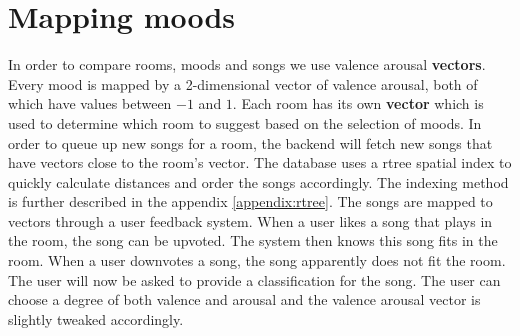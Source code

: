 \pagebreak
\section{Mapping moods}
\label{mapping-moods}
In order to compare rooms, moods and songs we use \gls{valence} \gls{arousal} \textbf{vectors}.
Every mood is mapped by a 2-dimensional vector of \gls{valence} \gls{arousal}, both of which have values between $-1$ and $1$.
Each room has its own \textbf{vector} which is used to determine which room to suggest based on the selection of moods.
In order to queue up new songs for a room, the backend will fetch new songs that have vectors close to the room's vector.
The database uses a \gls{rtree} spatial index to quickly calculate distances and order the songs accordingly.
The indexing method is further described in the appendix \ref{appendix:rtree}.
The songs are mapped to vectors through a user feedback system.
When a user likes a song that plays in the room, the song can be upvoted.
The system then knows this song fits in the room.
When a user downvotes a song, the song apparently does not fit the room.
The user will now be asked to provide a classification for the song.
The user can choose a degree of both valence and arousal and the valence arousal vector is slightly tweaked accordingly.
